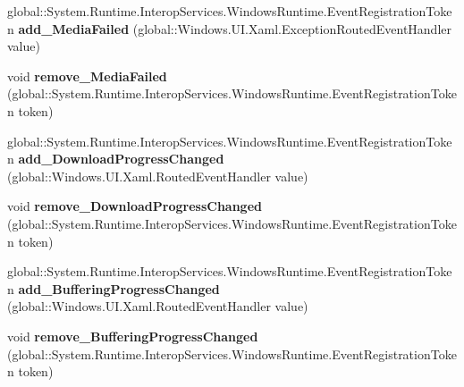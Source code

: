 \begin{DoxyCompactItemize}
\item 
\mbox{\label{class_windows_1_1_u_i_1_1_xaml_1_1_controls_1_1_media_element_aed63a8c47ee93be1333407e7b09e4594}} 
global\+::\+System.\+Runtime.\+Interop\+Services.\+Windows\+Runtime.\+Event\+Registration\+Token {\bfseries add\+\_\+\+Media\+Failed} (global\+::\+Windows.\+U\+I.\+Xaml.\+Exception\+Routed\+Event\+Handler value)
\item 
\mbox{\label{class_windows_1_1_u_i_1_1_xaml_1_1_controls_1_1_media_element_a22a64926578aa6a1496c7fe3f1f3dd97}} 
void {\bfseries remove\+\_\+\+Media\+Failed} (global\+::\+System.\+Runtime.\+Interop\+Services.\+Windows\+Runtime.\+Event\+Registration\+Token token)
\item 
\mbox{\label{class_windows_1_1_u_i_1_1_xaml_1_1_controls_1_1_media_element_a8050dc9cb01fd89c3bb3aaa30fce71e9}} 
global\+::\+System.\+Runtime.\+Interop\+Services.\+Windows\+Runtime.\+Event\+Registration\+Token {\bfseries add\+\_\+\+Download\+Progress\+Changed} (global\+::\+Windows.\+U\+I.\+Xaml.\+Routed\+Event\+Handler value)
\item 
\mbox{\label{class_windows_1_1_u_i_1_1_xaml_1_1_controls_1_1_media_element_af48fd901cd255c7b2f1ea0a9d21f9192}} 
void {\bfseries remove\+\_\+\+Download\+Progress\+Changed} (global\+::\+System.\+Runtime.\+Interop\+Services.\+Windows\+Runtime.\+Event\+Registration\+Token token)
\item 
\mbox{\label{class_windows_1_1_u_i_1_1_xaml_1_1_controls_1_1_media_element_a3b5145330cca79ed48d73975a1d80841}} 
global\+::\+System.\+Runtime.\+Interop\+Services.\+Windows\+Runtime.\+Event\+Registration\+Token {\bfseries add\+\_\+\+Buffering\+Progress\+Changed} (global\+::\+Windows.\+U\+I.\+Xaml.\+Routed\+Event\+Handler value)
\item 
\mbox{\label{class_windows_1_1_u_i_1_1_xaml_1_1_controls_1_1_media_element_a43685deb17b059f17c7f2151a44ba55d}} 
void {\bfseries remove\+\_\+\+Buffering\+Progress\+Changed} (global\+::\+System.\+Runtime.\+Interop\+Services.\+Windows\+Runtime.\+Event\+Registration\+Token token)

\end{DoxyCompactItemize}
